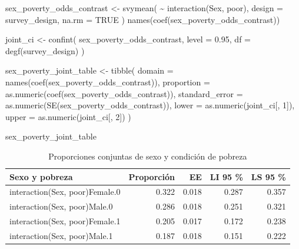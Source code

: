 \documentclass[
  spanish,
  11pt,
  letterpaper,
  oneside,
  open=any]{scrbook}
\newenvironment{Shaded}{\begin{snugshade}}{\end{snugshade}}
\newcommand{\AttributeTok}[1]{\textcolor[rgb]{0.40,0.45,0.13}{#1}}
\newcommand{\ConstantTok}[1]{\textcolor[rgb]{0.56,0.35,0.01}{#1}}
\newcommand{\DecValTok}[1]{\textcolor[rgb]{0.68,0.00,0.00}{#1}}
\newcommand{\FloatTok}[1]{\textcolor[rgb]{0.68,0.00,0.00}{#1}}
\newcommand{\FunctionTok}[1]{\textcolor[rgb]{0.28,0.35,0.67}{#1}}
\newcommand{\NormalTok}[1]{\textcolor[rgb]{0.00,0.23,0.31}{#1}}
\newcommand{\OtherTok}[1]{\textcolor[rgb]{0.00,0.23,0.31}{#1}}
\newcommand{\SpecialCharTok}[1]{\textcolor[rgb]{0.37,0.37,0.37}{#1}}
\begin{document}
\begin{Shaded}
\begin{Highlighting}[]
\NormalTok{sex\_poverty\_odds\_contrast }\OtherTok{\textless{}{-}} \FunctionTok{svymean}\NormalTok{(}
  \SpecialCharTok{\textasciitilde{}} \FunctionTok{interaction}\NormalTok{(Sex, poor),}
  \AttributeTok{design =}\NormalTok{ survey\_design,}
  \AttributeTok{na.rm =} \ConstantTok{TRUE}
\NormalTok{)}
\FunctionTok{names}\NormalTok{(}\FunctionTok{coef}\NormalTok{(sex\_poverty\_odds\_contrast))}

\NormalTok{joint\_ci }\OtherTok{\textless{}{-}} \FunctionTok{confint}\NormalTok{(}
\NormalTok{  sex\_poverty\_odds\_contrast,}
  \AttributeTok{level =} \FloatTok{0.95}\NormalTok{,}
  \AttributeTok{df =} \FunctionTok{degf}\NormalTok{(survey\_design)}
\NormalTok{)}

\NormalTok{sex\_poverty\_joint\_table }\OtherTok{\textless{}{-}} \FunctionTok{tibble}\NormalTok{(}
  \AttributeTok{domain =} \FunctionTok{names}\NormalTok{(}\FunctionTok{coef}\NormalTok{(sex\_poverty\_odds\_contrast)),}
  \AttributeTok{proportion =} \FunctionTok{as.numeric}\NormalTok{(}\FunctionTok{coef}\NormalTok{(sex\_poverty\_odds\_contrast)),}
  \AttributeTok{standard\_error =} \FunctionTok{as.numeric}\NormalTok{(}\FunctionTok{SE}\NormalTok{(sex\_poverty\_odds\_contrast)),}
  \AttributeTok{lower =} \FunctionTok{as.numeric}\NormalTok{(joint\_ci[, }\DecValTok{1}\NormalTok{]),}
  \AttributeTok{upper =} \FunctionTok{as.numeric}\NormalTok{(joint\_ci[, }\DecValTok{2}\NormalTok{])}
\NormalTok{)}

\NormalTok{sex\_poverty\_joint\_table}
\end{Highlighting}
\end{Shaded}

{

\begin{longtable}[]{@{}lrrrr@{}}

\caption{\label{tbl-interaccion-sexo-pobreza}Proporciones conjuntas de
sexo y condición de pobreza}

\tabularnewline

\toprule\noalign{}
Sexo y pobreza & Proporción & EE & LI 95 \% & LS 95 \% \\
\midrule\noalign{}
\endhead
\bottomrule\noalign{}
\endlastfoot
interaction(Sex, poor)Female.0 & 0.322 & 0.018 & 0.287 & 0.357 \\
interaction(Sex, poor)Male.0 & 0.286 & 0.018 & 0.251 & 0.321 \\
interaction(Sex, poor)Female.1 & 0.205 & 0.017 & 0.172 & 0.238 \\
interaction(Sex, poor)Male.1 & 0.187 & 0.018 & 0.151 & 0.222 \\

\end{longtable}

}
\end{document}
